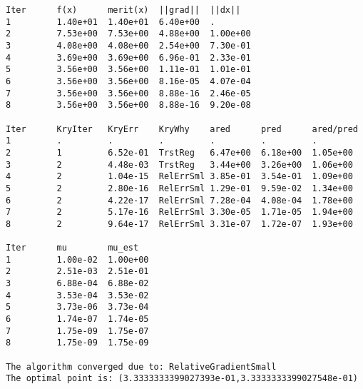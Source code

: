 \begin{lstlisting}[style=OptizelleOutput,caption={Output generated by Optizelle when running the simple inequality example.  We explain this output in Chapter \ref{ch:Output}.},label=lst:simpleIneqOut]
Iter      f(x)      merit(x)  ||grad||  ||dx||    
1         1.40e+01  1.40e+01  6.40e+00  .         
2         7.53e+00  7.53e+00  4.88e+00  1.00e+00  
3         4.08e+00  4.08e+00  2.54e+00  7.30e-01  
4         3.69e+00  3.69e+00  6.96e-01  2.33e-01  
5         3.56e+00  3.56e+00  1.11e-01  1.01e-01  
6         3.56e+00  3.56e+00  8.16e-05  4.07e-04  
7         3.56e+00  3.56e+00  8.88e-16  2.46e-05  
8         3.56e+00  3.56e+00  8.88e-16  9.20e-08  

Iter      KryIter   KryErr    KryWhy    ared      pred      ared/pred 
1         .         .         .         .         .         .         
2         1         6.52e-01  TrstReg   6.47e+00  6.18e+00  1.05e+00  
3         2         4.48e-03  TrstReg   3.44e+00  3.26e+00  1.06e+00  
4         2         1.04e-15  RelErrSml 3.85e-01  3.54e-01  1.09e+00  
5         2         2.80e-16  RelErrSml 1.29e-01  9.59e-02  1.34e+00  
6         2         4.22e-17  RelErrSml 7.28e-04  4.08e-04  1.78e+00  
7         2         5.17e-16  RelErrSml 3.30e-05  1.71e-05  1.94e+00  
8         2         9.64e-17  RelErrSml 3.31e-07  1.72e-07  1.93e+00 

Iter      mu        mu_est    
1         1.00e-02  1.00e+00  
2         2.51e-03  2.51e-01  
3         6.88e-04  6.88e-02  
4         3.53e-04  3.53e-02  
5         3.73e-06  3.73e-04  
6         1.74e-07  1.74e-05  
7         1.75e-09  1.75e-07  
8         1.75e-09  1.75e-09  

The algorithm converged due to: RelativeGradientSmall
The optimal point is: (3.3333333399027393e-01,3.3333333399027548e-01)
\end{lstlisting}
